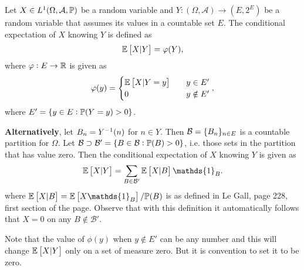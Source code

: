 \begin{definition}
	\label{def:E[X|Y]}
	Let $ X\in L^1(\Omega,\mathcal{A},\mathbb{P}) $ be a random variable and $ Y: (\Omega,\mathcal{A}) \to (E,2^E) $ be a random variable that assumes its values in a countable set $ E $. The conditional expectation of $ X $ knowing $ Y $ is defined as
	\[ \mathbb{E}\left[X|Y\right] = \varphi (Y), \]
	where $ \varphi: E \to \mathbb{R} $ is given as
	\[ \varphi(y) = \begin{cases}
		\mathbb{E}\left[X|Y=y\right] \quad & y\in E'\\
		0 \quad 		& y \notin E'
	\end{cases}, \]
	where $ E' = \{y \in E: \mathbb{P}(Y=y)> 0\} $.
	
	\textbf{Alternatively}, let $ B_n = Y^{-1}(n) $ for $ n \in Y $. Then $ \mathcal{B} = \{B_n\}_{n\in E} $ is a countable partition for $ \Omega $. Let $ \mathcal{B} \supset \mathcal{B}' = \{B \in \mathcal{B}: \mathbb{P}(B) > 0\}  $, i.e. those sets in the partition that has value zero. Then the conditional expectation of $ X $ knowing $ Y $ is given as
	\[ \E{X|Y} = \sum_{B \in \mathcal{B}'} \E{X|B}\mathds{1}_B. \]
	where $ \E{X|B} = \E{X\mathds{1}_B}/\prob(B) $ is as defined in Le Gall, page 228, first section of the page. Observe that with this definition it automatically follows that $ X = 0 $ on any $ B \notin \mathcal{B}' $.
\end{definition}
\begin{remark} 
	Note that the value of $ \phi(y) $ when $ y\not\in E' $ can be any number and this will change $ \mathbb{E}\left[X|Y\right] $ only on a set of measure zero. But it is convention to set it to be zero.
\end{remark}



